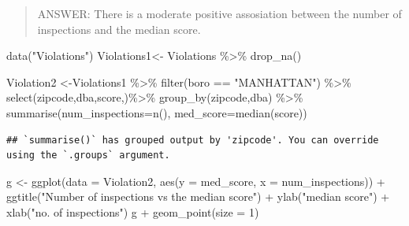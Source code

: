 \documentclass[
]{article}
\newenvironment{Shaded}{\begin{snugshade}}{\end{snugshade}}
\newcommand{\AttributeTok}[1]{\textcolor[rgb]{0.77,0.63,0.00}{#1}}
\newcommand{\DecValTok}[1]{\textcolor[rgb]{0.00,0.00,0.81}{#1}}
\newcommand{\FunctionTok}[1]{\textcolor[rgb]{0.00,0.00,0.00}{#1}}
\newcommand{\NormalTok}[1]{#1}
\newcommand{\OtherTok}[1]{\textcolor[rgb]{0.56,0.35,0.01}{#1}}
\newcommand{\SpecialCharTok}[1]{\textcolor[rgb]{0.00,0.00,0.00}{#1}}
\newcommand{\StringTok}[1]{\textcolor[rgb]{0.31,0.60,0.02}{#1}}
\begin{document}
\begin{quote}
ANSWER: There is a moderate positive assosiation between the number of
inspections and the median score.
\end{quote}

\begin{Shaded}
\begin{Highlighting}[]
\FunctionTok{data}\NormalTok{(}\StringTok{"Violations"}\NormalTok{)}
\NormalTok{Violations1}\OtherTok{\textless{}{-}}\NormalTok{ Violations }\SpecialCharTok{\%\textgreater{}\%} \FunctionTok{drop\_na}\NormalTok{()}
\end{Highlighting}
\end{Shaded}

\begin{Shaded}
\begin{Highlighting}[]
\NormalTok{Violation2 }\OtherTok{\textless{}{-}}\NormalTok{Violations1 }\SpecialCharTok{\%\textgreater{}\%}
  \FunctionTok{filter}\NormalTok{(boro }\SpecialCharTok{==} \StringTok{"MANHATTAN"}\NormalTok{) }\SpecialCharTok{\%\textgreater{}\%}
  \FunctionTok{select}\NormalTok{(zipcode,dba,score,)}\SpecialCharTok{\%\textgreater{}\%}
  \FunctionTok{group\_by}\NormalTok{(zipcode,dba) }\SpecialCharTok{\%\textgreater{}\%}
  \FunctionTok{summarise}\NormalTok{(}\AttributeTok{num\_inspections=}\FunctionTok{n}\NormalTok{(), }\AttributeTok{med\_score=}\FunctionTok{median}\NormalTok{(score))}
\end{Highlighting}
\end{Shaded}

\begin{verbatim}
## `summarise()` has grouped output by 'zipcode'. You can override using the `.groups` argument.
\end{verbatim}

\begin{Shaded}
\begin{Highlighting}[]
\NormalTok{g }\OtherTok{\textless{}{-}} \FunctionTok{ggplot}\NormalTok{(}\AttributeTok{data =}\NormalTok{ Violation2, }\FunctionTok{aes}\NormalTok{(}\AttributeTok{y =}\NormalTok{ med\_score, }\AttributeTok{x =}\NormalTok{ num\_inspections)) }\SpecialCharTok{+} \FunctionTok{ggtitle}\NormalTok{(}\StringTok{"Number of inspections vs the median score"}\NormalTok{) }\SpecialCharTok{+} \FunctionTok{ylab}\NormalTok{(}\StringTok{"median score"}\NormalTok{) }\SpecialCharTok{+} \FunctionTok{xlab}\NormalTok{(}\StringTok{"no. of inspections"}\NormalTok{)}
\NormalTok{g }\SpecialCharTok{+} \FunctionTok{geom\_point}\NormalTok{(}\AttributeTok{size =} \DecValTok{1}\NormalTok{)}
\end{Highlighting}
\end{Shaded}
\end{document}
